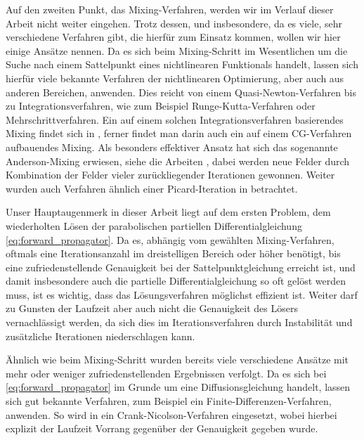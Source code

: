 Auf den zweiten Punkt, das Mixing-Verfahren, werden wir im Verlauf dieser Arbeit nicht weiter eingehen.
Trotz dessen, und insbesondere, da es viele, sehr verschiedene Verfahren gibt, die hierfür zum Einsatz kommen, wollen wir hier einige Ansätze nennen.
Da es sich beim Mixing-Schritt im Wesentlichen um die Suche nach einem Sattelpunkt eines nichtlinearen Funktionals handelt, lassen sich hierfür viele bekannte Verfahren der nichtlinearen Optimierung, aber auch aus anderen Bereichen, anwenden.
Dies reicht von einem Quasi-Newton-Verfahren \cite{Matsen:1994bz} bis zu Integrationsverfahren, wie zum Beispiel Runge-Kutta-Verfahren oder Mehrschrittverfahren.
Ein auf einem solchen Integrationsverfahren basierendes Mixing findet sich in \cite{Ceniceros:2006is}, ferner findet man darin auch ein auf einem CG-Verfahren aufbauendes Mixing.
Als besonders effektiver Ansatz hat sich das sogenannte Anderson-Mixing erwiesen, siehe die Arbeiten \cite{Thompson:2004um,Stasiak:2011ba}, dabei werden neue Felder durch Kombination der Felder vieler zurückliegender Iterationen gewonnen.
Weiter wurden auch Verfahren ähnlich einer Picard-Iteration in \cite{Drolet:1999bs} betrachtet.

Unser Hauptaugenmerk in dieser Arbeit liegt auf dem ersten Problem, dem wiederholten Lösen der parabolischen partiellen Differentialgleichung \cref{eq:forward_propagator}.
Da es, abhängig vom gewählten Mixing-Verfahren, oftmals eine Iterationsanzahl im dreistelligen Bereich oder höher benötigt, bis eine zufriedenstellende Genauigkeit bei der Sattelpunktgleichung erreicht ist, und damit insbesondere auch die partielle Differentialgleichung so oft gelöst werden muss, ist es wichtig, dass das Lösungsverfahren möglichst effizient ist.
Weiter darf zu Gunsten der Laufzeit aber auch nicht die Genauigkeit des Lösers vernachlässigt werden, da sich dies im Iterationsverfahren durch Instabilität und zusätzliche Iterationen niederschlagen kann.

Ähnlich wie beim Mixing-Schritt wurden bereits viele verschiedene Ansätze mit mehr oder weniger zufriedenstellenden Ergebnissen verfolgt.
Da es sich bei \cref{eq:forward_propagator} im Grunde um eine Diffusionsgleichung handelt, lassen sich gut bekannte Verfahren, zum Beispiel ein Finite-Differenzen-Verfahren, anwenden.
So wird in \cite{Drolet:1999bs} ein Crank-Nicolson-Verfahren eingesetzt, wobei hierbei explizit der Laufzeit Vorrang gegenüber der Genauigkeit gegeben wurde.

